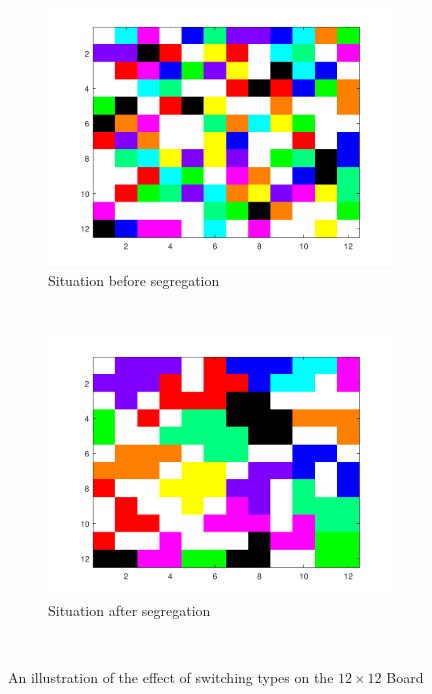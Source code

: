 \begin{figure}[H]
	\centering
    \begin{subfigure}{0.45\textwidth}
        \includegraphics[width=\textwidth]{Voorbeeld12_12_begin}
        \caption{Situation before segregation}
        \label{fig:wis12b}
    \end{subfigure}\hspace{0cm}
    ~ 
    \begin{subfigure}{0.45\textwidth}
        \includegraphics[width=\textwidth]{Voorbeeld12_12_eind}
        \caption{Situation after segregation}
        \label{fig:wis12a}
    \end{subfigure}
    ~ 
    \caption{An illustration of the effect of switching types on the \(12 \times 12\) Board}
    \label{fig:wissel 12}
\end{figure}
